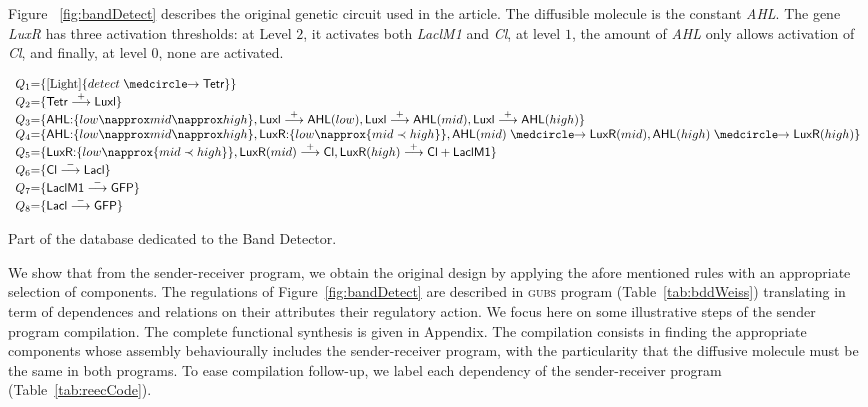 \documentclass{eptcs}
\newcommand{\activate}[0]{\stackrel{+}{\reg}}
\newcommand{\inhibit}[0]{\stackrel{-}{\reg}}
\newcounter{ti}
\begin{document}
Figure ~\ref{fig:bandDetect} describes the original genetic circuit used in the article. The diffusible molecule is the constant \emph{AHL}.
The gene \textit{LuxR} has three activation thresholds: at Level $2$, it activates both \textit{LaclM1} and \textit{Cl}, at level $1$, the amount of \textit{AHL} only allows activation of \textit{Cl}, and finally, at level $0$, none are activated.
\begin{table}[ht]
\footnotesize
\centering
$$
\begin{array}{l @{=} l} 
Q_1& \{\context{\text{Light}}\{detect \cause\textsf{Tetr}\}\} \\
Q_2& \{\textsf{Tetr}\activate\textsf{Luxl}\}\\
Q_3& \{\textsf{AHL:}\{low \napprox mid \napprox high \} , \textsf{Luxl}\activate\textsf{AHL}(low),\textsf{Luxl}\activate\textsf{AHL}(mid),\textsf{Luxl}\activate\textsf{AHL}(high) \}\\
Q_4& \{\textsf{AHL:}\{low \napprox mid \napprox high \} , \textsf{LuxR:}\{low \napprox \{mid \prec high\}\}, \textsf{AHL}(mid)\cause\textsf{LuxR}(mid),\textsf{AHL}(high)\cause\textsf{LuxR}(high)\}\\
Q_5& \{\textsf{LuxR:}\{low \napprox \{mid \prec high\} \}, \textsf{LuxR}(mid)\activate\textsf{Cl},\textsf{LuxR}(high)\activate\textsf{Cl}+\textsf{LaclM1} \}\\
Q_6& \{\textsf{Cl}\inhibit\textsf{Lacl}\}\\
Q_7 & \{\textsf{LaclM1}\inhibit\textsf{GFP}\}\\
Q_8 & \{\textsf{Lacl}\inhibit\textsf{GFP}\}
\end{array}
$$
\caption{Part of the database dedicated to the Band Detector.}
\label{tab:bddWeiss}
\end{table}
We show that from the sender-receiver program, we obtain the original design by applying the afore mentioned rules
 with an appropriate selection of components. The regulations of Figure~\ref{fig:bandDetect} are described in \textsc{gubs} program
(Table~\ref{tab:bddWeiss}) translating in term of dependences and relations on their attributes their regulatory action. We focus here on some illustrative steps of the sender program compilation. The complete functional synthesis is given in Appendix. The compilation consists in finding the appropriate components whose assembly behaviourally includes the sender-receiver program, with the particularity that the diffusive molecule must be the same in both programs. To ease compilation follow-up, we label each dependency of the sender-receiver program (Table~\ref{tab:reecCode}).
\end{document}
